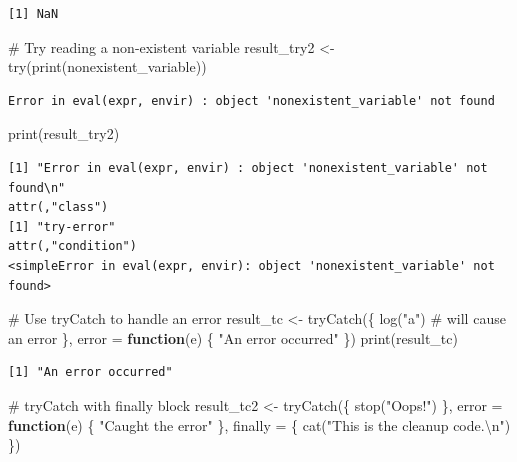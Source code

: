 \documentclass[
  letterpaper,
  DIV=11,
  numbers=noendperiod]{scrartcl}
\newenvironment{Shaded}{\begin{snugshade}}{\end{snugshade}}
\newcommand{\AttributeTok}[1]{\textcolor[rgb]{0.40,0.45,0.13}{#1}}
\newcommand{\CommentTok}[1]{\textcolor[rgb]{0.37,0.37,0.37}{#1}}
\newcommand{\ControlFlowTok}[1]{\textcolor[rgb]{0.00,0.23,0.31}{\textbf{#1}}}
\newcommand{\FunctionTok}[1]{\textcolor[rgb]{0.28,0.35,0.67}{#1}}
\newcommand{\NormalTok}[1]{\textcolor[rgb]{0.00,0.23,0.31}{#1}}
\newcommand{\OtherTok}[1]{\textcolor[rgb]{0.00,0.23,0.31}{#1}}
\newcommand{\SpecialCharTok}[1]{\textcolor[rgb]{0.37,0.37,0.37}{#1}}
\newcommand{\StringTok}[1]{\textcolor[rgb]{0.13,0.47,0.30}{#1}}
\begin{document}
\begin{verbatim}
[1] NaN
\end{verbatim}

\begin{Shaded}
\begin{Highlighting}[]
\CommentTok{\#   Try reading a non{-}existent variable}
\NormalTok{result\_try2 }\OtherTok{\textless{}{-}} \FunctionTok{try}\NormalTok{(}\FunctionTok{print}\NormalTok{(nonexistent\_variable))}
\end{Highlighting}
\end{Shaded}

\begin{verbatim}
Error in eval(expr, envir) : object 'nonexistent_variable' not found
\end{verbatim}

\begin{Shaded}
\begin{Highlighting}[]
\FunctionTok{print}\NormalTok{(result\_try2)}
\end{Highlighting}
\end{Shaded}

\begin{verbatim}
[1] "Error in eval(expr, envir) : object 'nonexistent_variable' not found\n"
attr(,"class")
[1] "try-error"
attr(,"condition")
<simpleError in eval(expr, envir): object 'nonexistent_variable' not found>
\end{verbatim}

\begin{Shaded}
\begin{Highlighting}[]
\CommentTok{\#   Use tryCatch to handle an error}
\NormalTok{result\_tc }\OtherTok{\textless{}{-}} \FunctionTok{tryCatch}\NormalTok{(\{}
  \FunctionTok{log}\NormalTok{(}\StringTok{"a"}\NormalTok{)  }\CommentTok{\# will cause an error}
\NormalTok{\}, }\AttributeTok{error =} \ControlFlowTok{function}\NormalTok{(e) \{}
  \StringTok{"An error occurred"}
\NormalTok{\})}
\FunctionTok{print}\NormalTok{(result\_tc)}
\end{Highlighting}
\end{Shaded}

\begin{verbatim}
[1] "An error occurred"
\end{verbatim}

\begin{Shaded}
\begin{Highlighting}[]
\CommentTok{\#   tryCatch with finally block}
\NormalTok{result\_tc2 }\OtherTok{\textless{}{-}} \FunctionTok{tryCatch}\NormalTok{(\{}
  \FunctionTok{stop}\NormalTok{(}\StringTok{"Oops!"}\NormalTok{)}
\NormalTok{\}, }\AttributeTok{error =} \ControlFlowTok{function}\NormalTok{(e) \{}
  \StringTok{"Caught the error"}
\NormalTok{\}, }\AttributeTok{finally =}\NormalTok{ \{}
  \FunctionTok{cat}\NormalTok{(}\StringTok{"This is the cleanup code.}\SpecialCharTok{\textbackslash{}n}\StringTok{"}\NormalTok{)}
\NormalTok{\})}
\end{Highlighting}
\end{Shaded}
\end{document}
